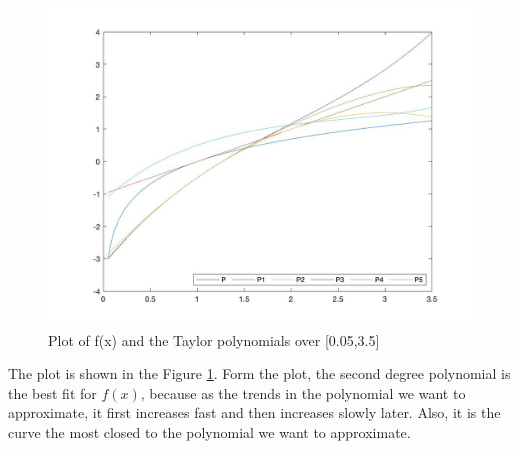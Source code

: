 \begin{answer}
    \begin{figure}[H]
        \centering
        \includegraphics[width=1.0\textwidth]{Figure 4.jpg}
        \caption{\label{fig:fig4}Plot of f(x) and the Taylor polynomials over [0.05,3.5]}
    \end{figure}
    The plot is shown in the Figure \ref{fig:fig4}. Form the plot, the second degree polynomial is the best fit for $f(x)$, because as the trends in the polynomial we want to approximate, it first increases fast and then increases slowly later. Also, it is the curve the most closed to the polynomial we want to approximate.
\end{answer}